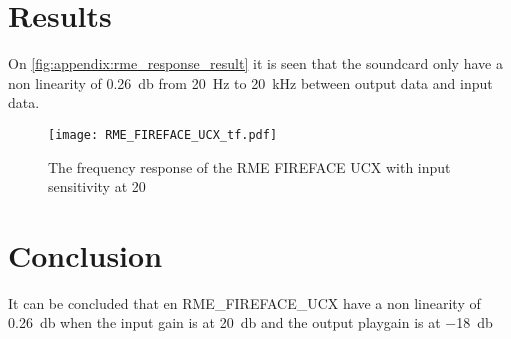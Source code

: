 \section*{Results}



On \autoref{fig:appendix:rme_response_result} it is seen that the soundcard only have a non linearity of \SI{0.26}{\decibel} from \SI{20}{\hertz} to \SI{20}{\kilo\hertz} between output data and input data. 

\begin{figure}[H]
	\centering
	\texttt{[image: RME\_FIREFACE\_UCX\_tf.pdf]}
	\caption{The frequency response of the RME FIREFACE UCX with input sensitivity at 20}
		\label{fig:appendix:rme_response_result}
\end{figure}

\section*{Conclusion}
It can be concluded that en RME_FIREFACE_UCX have a non linearity of \SI{0.26}{\decibel} when the input gain is at \SI{20}{\decibel} and the output playgain is at \SI{-18}{\decibel}


